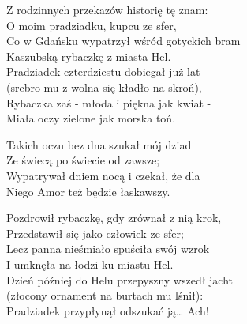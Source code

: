 \begin{text}
    Z rodzinnych przekazów historię tę znam:\\
    O moim pradziadku, kupcu ze sfer,\\
    Co w Gdańsku wypatrzył wśród gotyckich bram\\
    Kaszubską rybaczkę z miasta Hel.\\
    Pradziadek czterdziestu dobiegał już lat\\
    (srebro mu z wolna się kładło na skroń),\\
    Rybaczka zaś - młoda i piękna jak kwiat -\\
    Miała oczy zielone jak morska toń.

    \vin Takich oczu bez dna szukał mój dziad\\
    \vin Ze świecą po świecie od zawsze;\\
    \vin Wypatrywał dniem nocą i czekał, że dla\\
    \vin Niego Amor też będzie łaskawszy.

    Pozdrowił rybaczkę, gdy zrównał z nią krok,\\
    Przedstawił się jako człowiek ze sfer;\\
    Lecz panna nieśmiało spuściła swój wzrok\\
    I umknęła na łodzi ku miastu Hel.\\
    Dzień później do Helu przepyszny wszedł jacht\\
    (złocony ornament na burtach mu lśnił):\\
    Pradziadek przypłynął odszukać ją… Ach!
\end{text}
\begin{chord}

\end{chord}